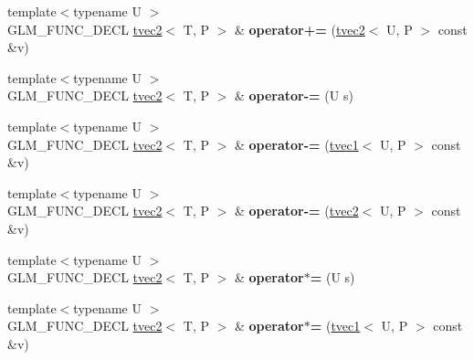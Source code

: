\begin{DoxyCompactItemize}
\item 
\hypertarget{structglm_1_1tvec2_a8b512889a3d9ef4536135b1806cb19c4}{{\footnotesize template$<$typename U $>$ }\\G\-L\-M\-\_\-\-F\-U\-N\-C\-\_\-\-D\-E\-C\-L \hyperlink{structglm_1_1tvec2}{tvec2}$<$ T, P $>$ \& {\bfseries operator+=} (\hyperlink{structglm_1_1tvec2}{tvec2}$<$ U, P $>$ const \&v)}\label{structglm_1_1tvec2_a8b512889a3d9ef4536135b1806cb19c4}

\item 
\hypertarget{structglm_1_1tvec2_ada376cf05dca5307a616e757db5a90b2}{{\footnotesize template$<$typename U $>$ }\\G\-L\-M\-\_\-\-F\-U\-N\-C\-\_\-\-D\-E\-C\-L \hyperlink{structglm_1_1tvec2}{tvec2}$<$ T, P $>$ \& {\bfseries operator-\/=} (U s)}\label{structglm_1_1tvec2_ada376cf05dca5307a616e757db5a90b2}

\item 
\hypertarget{structglm_1_1tvec2_ac78b83ac2b1331f1d99f1fa9465c4147}{{\footnotesize template$<$typename U $>$ }\\G\-L\-M\-\_\-\-F\-U\-N\-C\-\_\-\-D\-E\-C\-L \hyperlink{structglm_1_1tvec2}{tvec2}$<$ T, P $>$ \& {\bfseries operator-\/=} (\hyperlink{structglm_1_1tvec1}{tvec1}$<$ U, P $>$ const \&v)}\label{structglm_1_1tvec2_ac78b83ac2b1331f1d99f1fa9465c4147}

\item 
\hypertarget{structglm_1_1tvec2_a6ad11c3283bc3a6d76f92047e15d3fcc}{{\footnotesize template$<$typename U $>$ }\\G\-L\-M\-\_\-\-F\-U\-N\-C\-\_\-\-D\-E\-C\-L \hyperlink{structglm_1_1tvec2}{tvec2}$<$ T, P $>$ \& {\bfseries operator-\/=} (\hyperlink{structglm_1_1tvec2}{tvec2}$<$ U, P $>$ const \&v)}\label{structglm_1_1tvec2_a6ad11c3283bc3a6d76f92047e15d3fcc}

\item 
\hypertarget{structglm_1_1tvec2_ae5b246dcaaf85450ff253579b4fc4a76}{{\footnotesize template$<$typename U $>$ }\\G\-L\-M\-\_\-\-F\-U\-N\-C\-\_\-\-D\-E\-C\-L \hyperlink{structglm_1_1tvec2}{tvec2}$<$ T, P $>$ \& {\bfseries operator$\ast$=} (U s)}\label{structglm_1_1tvec2_ae5b246dcaaf85450ff253579b4fc4a76}

\item 
\hypertarget{structglm_1_1tvec2_a750b6e459213cd75ca333054f188779f}{{\footnotesize template$<$typename U $>$ }\\G\-L\-M\-\_\-\-F\-U\-N\-C\-\_\-\-D\-E\-C\-L \hyperlink{structglm_1_1tvec2}{tvec2}$<$ T, P $>$ \& {\bfseries operator$\ast$=} (\hyperlink{structglm_1_1tvec1}{tvec1}$<$ U, P $>$ const \&v)}\label{structglm_1_1tvec2_a750b6e459213cd75ca333054f188779f}


\end{DoxyCompactItemize}
